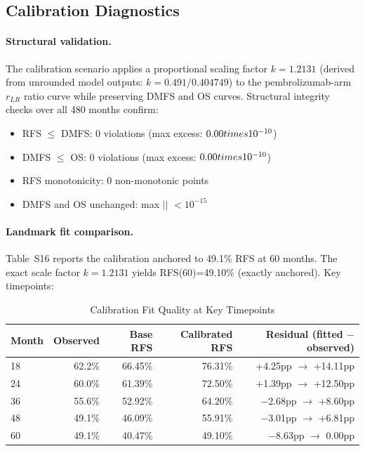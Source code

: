 
\subsection{Calibration Diagnostics}
\label{sec:calibration_diagnostics}

\paragraph{Structural validation.} The calibration scenario applies a proportional scaling factor $k=1.2131$ (derived from unrounded model outputs: $k = 0.491 / 0.404749$) to the pembrolizumab-arm $r_{LR}$ ratio curve while preserving DMFS and OS curves. Structural integrity checks over all 480 months confirm:
\begin{itemize}
    \item RFS $\leq$ DMFS: 0 violations (max excess: $0.00 \\times 10^{-10}$)
    \item DMFS $\leq$ OS: 0 violations (max excess: $0.00 \\times 10^{-10}$)
    \item RFS monotonicity: 0 non-monotonic points
    \item DMFS and OS unchanged: max $|$\Delta$|$ $< 10^{-15}$
\end{itemize}

\paragraph{Landmark fit comparison.} Table~S16 reports the calibration anchored to 49.1\% RFS at 60 months. The exact scale factor $k=1.2131$ yields RFS(60)=49.10\% (exactly anchored). Key timepoints:

\begin{table}[H]
\centering
\caption{Calibration Fit Quality at Key Timepoints}
\begin{tabular}{lrrrr}
\toprule
Month & Observed & Base RFS & Calibrated RFS & Residual (fitted $-$ observed) \\
\midrule
18 & 62.2\% & 66.45\% & 76.31\% & +4.25pp $\rightarrow$ +14.11pp \\
24 & 60.0\% & 61.39\% & 72.50\% & +1.39pp $\rightarrow$ +12.50pp \\
36 & 55.6\% & 52.92\% & 64.20\% & $-$2.68pp $\rightarrow$ +8.60pp \\
48 & 49.1\% & 46.09\% & 55.91\% & $-$3.01pp $\rightarrow$ +6.81pp \\
60 & 49.1\% & 40.47\% & 49.10\% & $-$8.63pp $\rightarrow$ 0.00pp \\
\bottomrule
\end{tabular}
\end{table}

